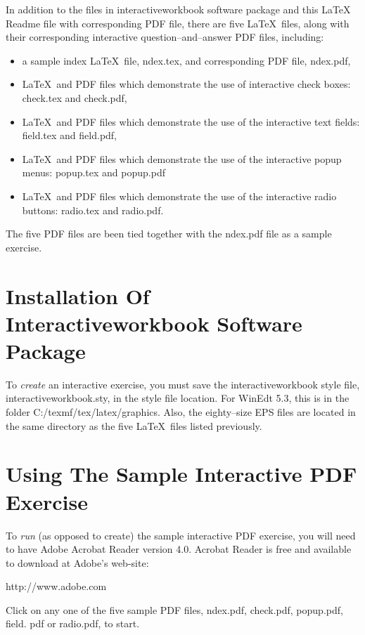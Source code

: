 \documentclass[12pt]{article}
\begin{document}
In addition to the files in interactiveworkbook software package
and this \LaTeX\, Readme file with corresponding PDF file, there
are five \LaTeX\, files, along with their corresponding
interactive question--and--answer PDF files, including:
\begin{itemize}
    \item a sample index \LaTeX\, file, ndex.tex, and corresponding PDF
    file, ndex.pdf,
    \item \LaTeX\, and PDF files which demonstrate the use of interactive check boxes:
    check.tex and check.pdf,
    \item \LaTeX\, and PDF files which demonstrate the use of the interactive text fields:
    field.tex and field.pdf,
    \item \LaTeX\, and PDF files which demonstrate the use of the interactive popup menus:
    popup.tex and popup.pdf
    \item \LaTeX\, and PDF files which demonstrate the use of the interactive radio buttons:
    radio.tex and radio.pdf.
\end{itemize}
The five PDF files are been tied together with the ndex.pdf file
as a sample exercise.


\section{Installation Of Interactiveworkbook Software Package}

To {\it create} an interactive exercise, you must save the
interactiveworkbook style file, interactiveworkbook.sty, in the
style file location.  For WinEdt 5.3, this is in the folder
C:/texmf/tex/latex/graphics.  Also, the eighty--size EPS files are
located in the same directory as the five \LaTeX\, files listed
previously.

\section{Using The Sample Interactive PDF Exercise}

To {\it run} (as opposed to create) the sample interactive PDF
exercise, you will need to have Adobe Acrobat Reader version 4.0.
Acrobat Reader is free and available to download at Adobe's
web-site:
\begin{center}
    http://www.adobe.com
\end{center}
Click on any one of the five sample PDF files, ndex.pdf,
check.pdf, popup.pdf, field. pdf or radio.pdf, to start.
\end{document}
